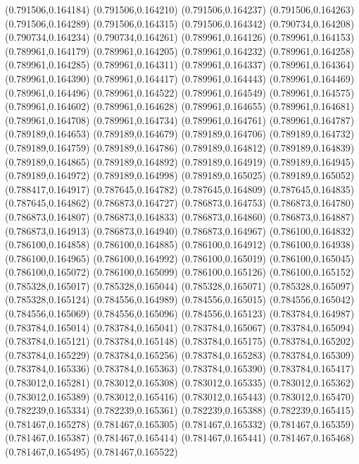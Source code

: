 (0.791506,0.164184)
(0.791506,0.164210)
(0.791506,0.164237)
(0.791506,0.164263)
(0.791506,0.164289)
(0.791506,0.164315)
(0.791506,0.164342)
(0.790734,0.164208)
(0.790734,0.164234)
(0.790734,0.164261)
(0.789961,0.164126)
(0.789961,0.164153)
(0.789961,0.164179)
(0.789961,0.164205)
(0.789961,0.164232)
(0.789961,0.164258)
(0.789961,0.164285)
(0.789961,0.164311)
(0.789961,0.164337)
(0.789961,0.164364)
(0.789961,0.164390)
(0.789961,0.164417)
(0.789961,0.164443)
(0.789961,0.164469)
(0.789961,0.164496)
(0.789961,0.164522)
(0.789961,0.164549)
(0.789961,0.164575)
(0.789961,0.164602)
(0.789961,0.164628)
(0.789961,0.164655)
(0.789961,0.164681)
(0.789961,0.164708)
(0.789961,0.164734)
(0.789961,0.164761)
(0.789961,0.164787)
(0.789189,0.164653)
(0.789189,0.164679)
(0.789189,0.164706)
(0.789189,0.164732)
(0.789189,0.164759)
(0.789189,0.164786)
(0.789189,0.164812)
(0.789189,0.164839)
(0.789189,0.164865)
(0.789189,0.164892)
(0.789189,0.164919)
(0.789189,0.164945)
(0.789189,0.164972)
(0.789189,0.164998)
(0.789189,0.165025)
(0.789189,0.165052)
(0.788417,0.164917)
(0.787645,0.164782)
(0.787645,0.164809)
(0.787645,0.164835)
(0.787645,0.164862)
(0.786873,0.164727)
(0.786873,0.164753)
(0.786873,0.164780)
(0.786873,0.164807)
(0.786873,0.164833)
(0.786873,0.164860)
(0.786873,0.164887)
(0.786873,0.164913)
(0.786873,0.164940)
(0.786873,0.164967)
(0.786100,0.164832)
(0.786100,0.164858)
(0.786100,0.164885)
(0.786100,0.164912)
(0.786100,0.164938)
(0.786100,0.164965)
(0.786100,0.164992)
(0.786100,0.165019)
(0.786100,0.165045)
(0.786100,0.165072)
(0.786100,0.165099)
(0.786100,0.165126)
(0.786100,0.165152)
(0.785328,0.165017)
(0.785328,0.165044)
(0.785328,0.165071)
(0.785328,0.165097)
(0.785328,0.165124)
(0.784556,0.164989)
(0.784556,0.165015)
(0.784556,0.165042)
(0.784556,0.165069)
(0.784556,0.165096)
(0.784556,0.165123)
(0.783784,0.164987)
(0.783784,0.165014)
(0.783784,0.165041)
(0.783784,0.165067)
(0.783784,0.165094)
(0.783784,0.165121)
(0.783784,0.165148)
(0.783784,0.165175)
(0.783784,0.165202)
(0.783784,0.165229)
(0.783784,0.165256)
(0.783784,0.165283)
(0.783784,0.165309)
(0.783784,0.165336)
(0.783784,0.165363)
(0.783784,0.165390)
(0.783784,0.165417)
(0.783012,0.165281)
(0.783012,0.165308)
(0.783012,0.165335)
(0.783012,0.165362)
(0.783012,0.165389)
(0.783012,0.165416)
(0.783012,0.165443)
(0.783012,0.165470)
(0.782239,0.165334)
(0.782239,0.165361)
(0.782239,0.165388)
(0.782239,0.165415)
(0.781467,0.165278)
(0.781467,0.165305)
(0.781467,0.165332)
(0.781467,0.165359)
(0.781467,0.165387)
(0.781467,0.165414)
(0.781467,0.165441)
(0.781467,0.165468)
(0.781467,0.165495)
(0.781467,0.165522)
